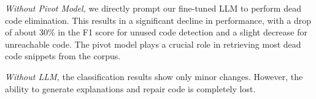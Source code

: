 \documentclass[11pt]{article}
\begin{document}
\begin{table}[h]
\centering
\small
\renewcommand{\arraystretch}{1.2}
\caption{Ablation study results of DCE-LLM}
\label{tab4}
\end{table}



\textit{Without Pivot Model, }we directly prompt our fine-tuned LLM to perform dead code elimination. This results in a significant decline in performance, with a drop of about 30\% in the F1 score for unused code detection and a slight decrease for unreachable code. The pivot model plays a crucial role in retrieving most dead code snippets from the corpus.

\textit{Without LLM, }the classification results show only minor changes. However, the ability to generate explanations and repair code is completely lost.
\end{document}
